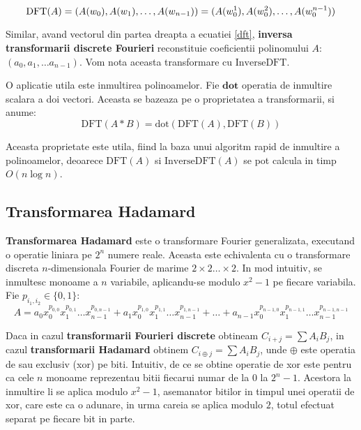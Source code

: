 \begin{equation}
  \label{dft}
  \text{DFT}(A) = (A(w_{0}), A(w_{1}), \ldots, A(w_{n-1})) \\
                = (A(w_{0}^{1}), A(w_{0}^{2}), \ldots, A(w_{0}^{n-1}))
\end{equation}

Similar, avand vectorul din partea dreapta a ecuatiei \ref{dft}, \textbf{inversa
transformarii discrete Fourieri} reconstituie coeficientii polinomului $A$:
$(a_{0}, a_{1}, \ldots a_{n-1})$. Vom nota aceasta transformare cu
$\text{InverseDFT}$. \par

O aplicatie utila este inmultirea polinoamelor. Fie $\textbf{dot}$ operatia de
inmultire scalara a doi vectori. Aceasta se bazeaza pe o
proprietatea a transformarii, si anume:
\begin{equation}
  \text{DFT}(A * B) = \text{dot}(\text{DFT}(A), \text{DFT}(B))
\end{equation}

Aceasta proprietate este utila, fiind la baza unui algoritm rapid de inmultire a
polinoamelor, deoarece $\text{DFT}(A)$ si $\text{InverseDFT}(A)$ se pot calcula
in timp $O(n \log n)$.

\subsection{Transformarea Hadamard}

\textbf{Transformarea Hadamard} este o transformare Fourier generalizata,
executand o operatie liniara pe $2^{n}$ numere reale. Aceasta este echivalenta
cu o transformare discreta $n$-dimensionala Fourier de marime
$2 \times 2 \ldots \times 2$. In mod intuitiv, se inmultesc monoame a $n$
variabile, aplicandu-se modulo $x^{2}-1$ pe fiecare variabila. Fie $p_{i_{1}, i_{2}} \in \{0, 1\}$:
\begin{equation}
  A = a_{0} x_{0}^{p_{0, 0}} x_{1}^{p_{0, 1}} \ldots x_{n-1}^{p_{0, n-1}}
  + a_{1} x_{0}^{p_{1, 0}} x_{1}^{p_{1, 1}} \ldots x_{n-1}^{p_{1, n-1}}
  + \ldots
  + a_{n-1} x_{0}^{p_{n-1, 0}} x_{1}^{p_{n-1, 1}} \ldots x_{n-1}^{p_{n-1, n-1}}
\end{equation}

Daca in cazul \textbf{transformarii Fourieri discrete} obtineam
$C_{i+j} = \sum A_{i} B_{j}$, in cazul \textbf{transformarii Hadamard} obtinem
$C_{i \oplus j} = \sum A_{i} B_{j}$, unde $\oplus$ este operatia de sau exclusiv
(xor) pe biti. Intuitiv, de ce se obtine operatie de xor este pentru ca
cele $n$ monoame reprezentau bitii fiecarui numar de la $0$ la $2^{n} - 1$.
Acestora la inmultire li se aplica modulo $x^{2} - 1$, asemanator bitilor in
timpul unei operatii de xor, care este ca o adunare, in urma careia se aplica
modulo $2$, totul efectuat separat pe fiecare bit in parte.

